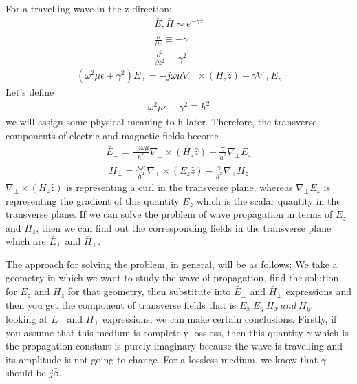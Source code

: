For a travelling wave in the z-direction;
\begin{align*}
\bar{E}, \bar{H} \sim e^{-\gamma z}\\
\frac{\partial}{\partial z} \equiv -\gamma\\
\frac{\partial^2}{\partial z^2} \equiv \gamma^2
\end{align*}
\begin{align*}
(\omega^2\mu\epsilon + \gamma^2)\bar{E}_\bot = -j\omega\mu\nabla_\bot\times(H_z\hat{z})-\gamma\nabla_\bot E_z
\end{align*}
Let's define
\begin{align}
\omega^2\mu\epsilon + \gamma^2 \equiv h^2
\label{eqn:h}
\end{align}
we will assign some physical meaning to h later. Therefore, the transverse components of electric and magnetic fields become
\begin{align}
\bar{E}_\bot = \frac{-j\omega\mu}{h^2}\nabla_\bot\times(H_z\hat{z}) - \frac{\gamma}{h^2}\nabla_\bot E_z
\label{eqn:transverseele2}
\end{align}
\begin{align}
\bar{H}_\bot = \frac{j\omega\epsilon}{h^2}\nabla_\bot\times(E_z\hat{z}) - \frac{\gamma}{h^2}\nabla_\bot H_z
\label{eqn:transversemag2}
\end{align}
$\nabla_\bot\times(H_z\hat{z})$ is representing a curl in the transverse plane, whereas $\nabla_\bot E_z$ is representing the gradient of this quantity $E_z$ which is the scalar quantity in the transverse plane. If we can solve the problem of wave propagation in terms of $E_z$ and $H_z$, then we can find out the corresponding fields in the transverse plane which are $\bar{E}_\bot$ and $\bar{H}_\bot$.

The approach for solving the problem, in general, will be as follows; We take a geometry in which we want to study the wave of propagation, find the solution for $E_z$ and $H_z$ for that geometry, then substitute into $\bar{E}_\bot$ and $\bar{H}_\bot$ expressions and then you get the component of transverse fields that is $E_x\ E_y\ H_x\ and\ H_y$.\\looking at $\bar{E}_\bot$ and $\bar{H}_\bot$ expressions, we can make certain conclusions. Firstly, if you assume that this medium is completely lossless, then this quantity $\gamma$ which is the propagation constant is purely imaginary because the wave is travelling and its amplitude is not going to change. For a lossless medium, we know that $\gamma$ should be $j\bar{\beta}$.
